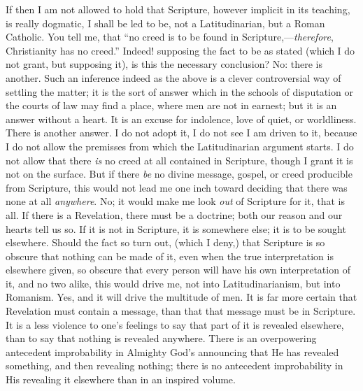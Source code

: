 If then I am not allowed to hold that Scripture, however implicit
in its teaching, is really dogmatic, I shall be led to be, not a
Latitudinarian, but a Roman Catholic. You tell me, that ``no creed
is to be found in Scripture,—\emph{therefore}, Christianity has no
creed.'' Indeed! supposing the fact to be as stated (which I do
not grant, but supposing it), is this the necessary conclusion? No:
there is another. Such an inference indeed as the above is a clever
controversial way of settling the matter; it is the sort of answer
which in the schools of disputation or the courts of law may find a
place, where men are not in earnest; but it is an answer without a
heart. It is an excuse for indolence, love of quiet, or worldliness.
There is another answer. I do not adopt it, I do not see I am driven
to it, because I do not allow the premisses from which the
Latitudinarian argument starts. I do not allow that there \emph{is} no creed
at all contained in Scripture, though I grant it is not on the
surface. But if there \emph{be} no divine message, gospel, or creed
producible from Scripture, this would not lead me one inch toward
deciding that there was none at all \emph{anywhere}. No; it would make
me look \emph{out} of Scripture for it, that is all. If there is a
Revelation, there must be a doctrine; both our reason and our hearts
tell us so. If it is not in Scripture, it is somewhere else; it is to
be sought elsewhere. Should the fact so turn out, (which I deny,) that
Scripture is so obscure that nothing can be made of it, even when the
true interpretation is elsewhere given, so obscure that every person
will have his own interpretation of it, and no two alike, this
would drive me, not into Latitudinarianism, but into Romanism. Yes,
and it will drive the multitude of men. It is far more certain that
Revelation must contain a message, than that that message must be in
Scripture. It is a less violence to one's feelings to say that part of
it is revealed elsewhere, than to say that nothing is revealed
anywhere. There is an overpowering antecedent improbability in
Almighty God's announcing that He has revealed something, and then
revealing nothing; there is no antecedent improbability in His
revealing it elsewhere than in an inspired volume.

